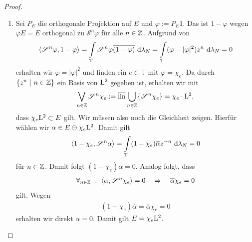 \begin{proof}
\begin{enumerate}[label=\textbf{(\arabic*)}]
\item
Sei $P_E$ die orthogonale Projektion auf $E$ und $\varphi := P_E 1 $.
Das ist $1- \varphi$ wegen $\varphi E = E$ orthogonal zu $\mathscr{S}^n \varphi$ für alle $n \in \mathbb{Z}$.
Aufgrund von 
\begin{align*}
\langle \mathscr{S}^n \varphi, 1 - \varphi \rangle 
= \int \limits_\mathbb{T} \mathscr{S}^n \varphi \overline{(1 - \varphi)} \ \text{\rmfamily d} \lambda_N
= \int \limits_\mathbb{T} (\varphi - | \varphi|^2) z^n \ \text{\rmfamily d} \lambda_N
= 0
\end{align*}
erhalten wir $\varphi = | \varphi|^2$ und finden ein $e \subset \mathbb{T}$ mit $\varphi = \chi_e$.
Da durch $\lbrace z^n \ | \ n \in \mathbb{Z} \rbrace $ ein Basis von $\mathrm{L}^2$ gegeben ist, erhalten wir mit
\begin{align*}
\bigvee_{n \in \mathbb{Z}} \mathscr{S}^n \chi_e :=
\overline{\operatorname{lin}} \bigcup_{n \in \mathbb{Z}} \lbrace \mathscr{S}^n \chi_e \rbrace
= \chi_e \cdot \mathrm{L}^2,
\end{align*}
dass $\chi_e \mathrm{L}^2 \subset E$ gilt.
Wir müssen also noch die Gleichheit zeigen.
Hierfür wählen wir $\alpha \in E \ominus \chi_e \mathrm{L}^2 $.
Damit gilt 
\begin{align*}
\langle 1- \chi_e , \mathscr{S}^n \alpha \rangle = 
\int \limits_\mathbb{T} (1- \chi_e) \overline{\alpha} z^{-n} \ \text{\rmfamily d} \lambda_N = 0
\end{align*}
für $n \in \mathbb{Z}$. Damit folgt $(1- \chi_e) \overline{\alpha} = 0$.
Analog folgt, dass 
\begin{align*}
\forall_{n \in \mathbb{Z}}  \ : \ \langle \alpha , \mathscr{S}^n \chi_e \rangle = 0
\quad \Rightarrow \quad \overline{\alpha} \chi _e= 0
\end{align*}
gilt. Wegen 
\begin{align*}
(1- \chi_e) \overline{\alpha} =
\overline{\alpha} \chi _e= 0
\end{align*}
erhalten wir direkt $\alpha = 0$.
Damit gilt $E = \chi_e \mathrm{L}^2$.


\end{enumerate}
\end{proof}
